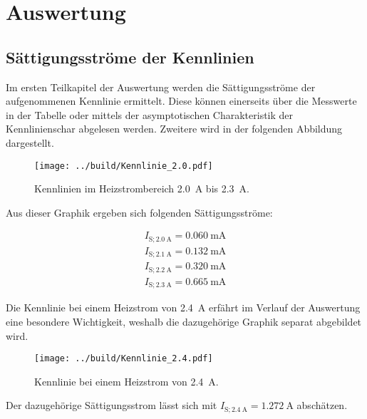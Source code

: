 



\section{Auswertung}
\label{sec:Auswertung}

\subsection{Sättigungsströme der Kennlinien}
\label{sec:Saettigungsstrom}

Im ersten Teilkapitel der Auswertung werden die Sättigungsströme der aufgenommenen Kennlinie ermittelt. Diese können einerseits über die Messwerte in der Tabelle 
oder mittels der asymptotischen Charakteristik der Kennlinienschar abgelesen werden. Zweitere wird in der folgenden Abbildung dargestellt.

\begin{figure}[H]
    \centering
    \texttt{[image: ../build/Kennlinie\_2.0.pdf]}
    \caption{Kennlinien im Heizstrombereich \qty{2.0}{\ampere} bis \qty{2.3}{\ampere}.}
    \label{fig:Kennlinien1}
\end{figure}

Aus dieser Graphik ergeben sich folgenden Sättigungsströme:

\begin{align*}
    I_{\text{S};\qty{2.0}{\ampere}} = \qty{0.060}{\milli\ampere}\\
    I_{\text{S};\qty{2.1}{\ampere}} = \qty{0.132}{\milli\ampere}\\   
    I_{\text{S};\qty{2.2}{\ampere}} = \qty{0.320}{\milli\ampere}\\   
    I_{\text{S};\qty{2.3}{\ampere}} = \qty{0.665}{\milli\ampere}
\end{align*}

\noindent Die Kennlinie bei einem Heizstrom von \qty{2.4}{\ampere} erfährt im Verlauf der Auswertung eine besondere Wichtigkeit, weshalb die dazugehörige Graphik 
separat abgebildet wird. 

\begin{figure}[H]
    \centering 
    \texttt{[image: ../build/Kennlinie\_2.4.pdf]}
    \caption{Kennlinie bei einem Heizstrom von \qty{2.4}{\ampere}.}
    \label{fig:Kennlinien2}
\end{figure}

\noindent Der dazugehörige Sättigungsstrom lässt sich mit $I_{\text{S};\qty{2.4}{\ampere}} = \qty{1.272}{\ampere}$ abschätzen.

